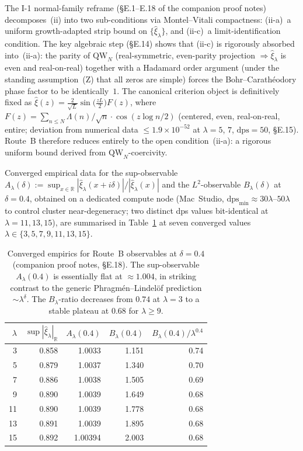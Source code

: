 \documentclass[12pt,a4paper]{article}
\theoremstyle{definition}
\theoremstyle{remark}
\begin{document}
The I-1 normal-family reframe (\S E.1--E.18 of the companion proof notes) decomposes~(ii) into
two sub-conditions via Montel--Vitali compactness:
(ii-a)~a uniform growth-adapted strip bound on $\{\hat\xi_\lambda\}$, and
(ii-c)~a limit-identification condition.
The key algebraic step (\S E.14) shows that (ii-c) is rigorously absorbed
into~(ii-a): the parity of $\mathrm{QW}_N$ (real-symmetric, even-parity
projection $\Rightarrow \hat\xi_\lambda$ is even and real-on-real) together with
a Hadamard order argument (under the standing assumption~(Z) that all
zeros are simple) forces the Bohr--Carath\'eodory phase factor to be
identically~$1$.
The canonical criterion object is definitively fixed as
$\hat\xi(z) = \tfrac{2}{\sqrt{L}}\sin\!\bigl(\tfrac{zL}{2}\bigr)F(z)$,
where $F(z) = \sum_{n \leq N} \Lambda(n)/\sqrt{n}\cdot\cos(z\log n/2)$
(centered, even, real-on-real, entire; deviation from numerical data
$\leq 1.9 \times 10^{-52}$ at $\lambda = 5$, $7$, $\mathrm{dps}=50$, \S E.15).
Route~B therefore reduces entirely to the open condition~(ii-a): a rigorous
uniform bound derived from $\mathrm{QW}_N$-coercivity.

Converged empirical data for the sup-observable
$A_\lambda(\delta) := \sup_{x\in\mathbb{R}} |\hat\xi_\lambda(x+i\delta)|/|\hat\xi_\lambda(x)|$
and the $L^2$-observable $B_\lambda(\delta)$ at $\delta = 0.4$, obtained on a dedicated compute node
(Mac~Studio, $\mathrm{dps}_{\min} \approx 30\lambda$--$50\lambda$
to control cluster near-degeneracy; two distinct dps values bit-identical at $\lambda = 11, 13, 15$),
are summarised in Table~\ref{tab:route-b-empirics} at seven converged values
$\lambda \in \{3, 5, 7, 9, 11, 13, 15\}$.

\begin{table}[h]
\centering
\small
\begin{tabular}{r r r r r}
\hline
$\lambda$ & $\sup|\hat\xi_\lambda|_{\mathbb{R}}$ & $A_\lambda(0.4)$ & $B_\lambda(0.4)$ & $B_\lambda(0.4)/\lambda^{0.4}$ \\
\hline
 3 & 0.858 & 1.0033  & 1.151 & 0.74 \\
 5 & 0.879 & 1.0037  & 1.340 & 0.70 \\
 7 & 0.886 & 1.0038  & 1.505 & 0.69 \\
 9 & 0.890 & 1.0039  & 1.649 & 0.68 \\
11 & 0.890 & 1.0039  & 1.778 & 0.68 \\
13 & 0.891 & 1.0039  & 1.895 & 0.68 \\
15 & 0.892 & 1.00394 & 2.003 & 0.68 \\
\hline
\end{tabular}
\caption{Converged empirics for Route~B observables at $\delta = 0.4$
(companion proof notes, \S E.18). The sup-observable $A_\lambda(0.4)$ is
essentially flat at $\approx 1.004$, in striking contrast to the generic
Phragm\'en--Lindel\"of prediction $\sim \lambda^\delta$. The $B_\lambda$-ratio
decreases from $0.74$ at $\lambda = 3$ to a stable plateau at $0.68$ for
$\lambda \geq 9$.}
\label{tab:route-b-empirics}
\end{table}
\end{document}
